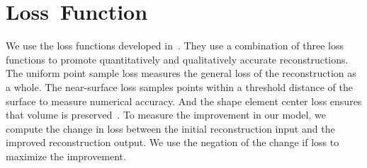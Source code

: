 \section{Loss~Function}
\label{sec:loss_function}

We use the loss functions developed in~\cite{Genova2020, Genova2019}. They use a combination of three loss functions to promote quantitatively and qualitatively accurate reconstructions. The uniform point sample loss measures the general loss of the reconstruction as a whole. The near-surface loss samples points within a threshold distance of the surface to measure numerical accuracy. And the shape element center loss ensures that volume is preserved~\cite{Genova2019}. To measure the improvement in our model, we compute the change in loss between the initial reconstruction input and the improved reconstruction output. We use the negation of the change if loss to maximize the improvement.
